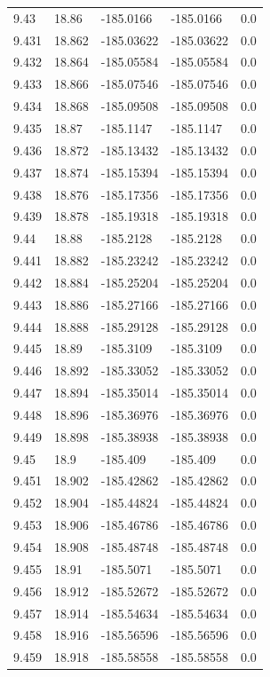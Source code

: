 \begin{tabular}{lllll}
9.43 & 18.86 & -185.0166 & -185.0166 & 0.0 \\
9.431 & 18.862 & -185.03622 & -185.03622 & 0.0 \\
9.432 & 18.864 & -185.05584 & -185.05584 & 0.0 \\
9.433 & 18.866 & -185.07546 & -185.07546 & 0.0 \\
9.434 & 18.868 & -185.09508 & -185.09508 & 0.0 \\
9.435 & 18.87 & -185.1147 & -185.1147 & 0.0 \\
9.436 & 18.872 & -185.13432 & -185.13432 & 0.0 \\
9.437 & 18.874 & -185.15394 & -185.15394 & 0.0 \\
9.438 & 18.876 & -185.17356 & -185.17356 & 0.0 \\
9.439 & 18.878 & -185.19318 & -185.19318 & 0.0 \\
9.44 & 18.88 & -185.2128 & -185.2128 & 0.0 \\
9.441 & 18.882 & -185.23242 & -185.23242 & 0.0 \\
9.442 & 18.884 & -185.25204 & -185.25204 & 0.0 \\
9.443 & 18.886 & -185.27166 & -185.27166 & 0.0 \\
9.444 & 18.888 & -185.29128 & -185.29128 & 0.0 \\
9.445 & 18.89 & -185.3109 & -185.3109 & 0.0 \\
9.446 & 18.892 & -185.33052 & -185.33052 & 0.0 \\
9.447 & 18.894 & -185.35014 & -185.35014 & 0.0 \\
9.448 & 18.896 & -185.36976 & -185.36976 & 0.0 \\
9.449 & 18.898 & -185.38938 & -185.38938 & 0.0 \\
9.45 & 18.9 & -185.409 & -185.409 & 0.0 \\
9.451 & 18.902 & -185.42862 & -185.42862 & 0.0 \\
9.452 & 18.904 & -185.44824 & -185.44824 & 0.0 \\
9.453 & 18.906 & -185.46786 & -185.46786 & 0.0 \\
9.454 & 18.908 & -185.48748 & -185.48748 & 0.0 \\
9.455 & 18.91 & -185.5071 & -185.5071 & 0.0 \\
9.456 & 18.912 & -185.52672 & -185.52672 & 0.0 \\
9.457 & 18.914 & -185.54634 & -185.54634 & 0.0 \\
9.458 & 18.916 & -185.56596 & -185.56596 & 0.0 \\
9.459 & 18.918 & -185.58558 & -185.58558 & 0.0 \\

\end{tabular}
